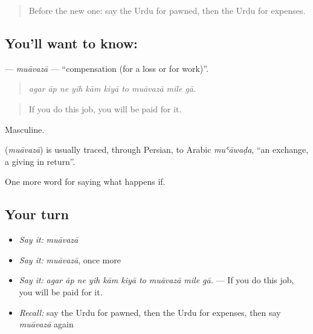 \label{lesson:UR-C540-muavaza}



\begin{quote}
Before the new one: say the Urdu for pawned, then the Urdu for expenses.
\end{quote}

\subsection*{You'll want to know: }
\textbf{} — \emph{muāvazā} — \textquotedblleft{}compensation (for a loss or for work)\textquotedblright{}.

\begin{quote}
         
\end{quote}

\begin{quote}
\emph{agar āp ne yih kām kiyā to muāvazā mile gā.}
\end{quote}

\begin{quote}
If you do this job, you will be paid for it.
\end{quote}

Masculine.

\begin{cousinweb}
\textbf{} (\emph{muāvazā}) is usually traced, through Persian, to Arabic \emph{muʿāwaḍa}, \textquotedblleft{}an exchange, a giving in return\textquotedblright{}.
\end{cousinweb}

\begin{grammarlens}[title={What you've built}]
One more word for saying what happens if.
\end{grammarlens}

\subsection*{Your turn}
\begin{itemize}
\raggedright
  \item \emph{Say it:} \emph{muāvazā}
  \item \emph{Say it:} \emph{muāvazā}, once more
  \item \emph{Say it:} \emph{agar āp ne yih kām kiyā to muāvazā mile gā.} — If you do this job, you will be paid for it.
  \item \emph{Recall:} say the Urdu for pawned, then the Urdu for expenses, then say \emph{muāvazā} again
\end{itemize}

